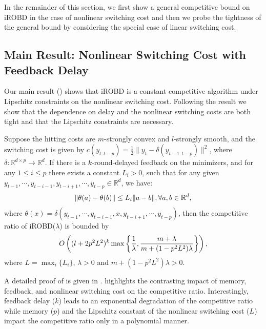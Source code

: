 In the remainder of this section, we first show a general competitive bound on iROBD in the case of nonlinear switching cost and then we probe the tightness of the general bound by considering the special case of linear switching cost.



\subsection{Main Result: Nonlinear Switching Cost with Feedback Delay}

Our main result () shows that iROBD is a constant competitive algorithm under Lipschitz constraints on the nonlinear switching cost. Following the result we show that the dependence on delay and the nonlinear switching costs are both tight and that the Lipschitz constraints are necessary. 


\begin{theorem} \label{t.main}
Suppose the hitting costs are $m$-strongly convex and $l$-strongly smooth, and the switching cost is given by $c(y_{t:t-p})=\frac{1}{2}\|y_t-\delta(y_{t-1:t-p})\|^2$, where $\delta:\mathbb{R}^{d\times p}\to\mathbb{R}^d$. If there is a $k$-round-delayed feedback on the minimizers, and for any $1\le i\le p$ there exists a constant $L_i>0$, such that for any given $y_{t-1},\cdots,y_{t-i-1},y_{t-i+1},\cdots,y_{t-p}\in\mathbb{R}^d$, we have:
\begin{align}
    \|\theta(a)-\theta(b)\|\le L_i\|a-b\|,\forall a,b\in\mathbb{R}^d,\notag
\end{align}
where $\theta(x)=\delta(y_{t-1},\cdots,y_{t-i-1},x,y_{t-i+1},\cdots,y_{t-p})$, then the competitive ratio of iROBD($\lambda$) is bounded by 
\begin{align}
    O\left((l+2p^2L^2)^k\max\left\{\frac{1}{\lambda},\frac{m+\lambda}{m+(1-p^2L^2)\lambda}\right\}\right),\notag
\end{align}
where $L=\max_i\{L_i\}$, $\lambda>0$ and $m+(1-p^2L^2)\lambda>0$.
\end{theorem}

A detailed proof of  is given in .  highlights the contrasting impact of memory, feedback, and nonlinear switching cost on the competitive ratio.  Interestingly, feedback delay ($k$) leads to an exponential degradation of the competitive ratio while memory ($p$) and the Lipschitz constant of the nonlinear switching cost ($L$) impact the competitive ratio only in a polynomial manner.


